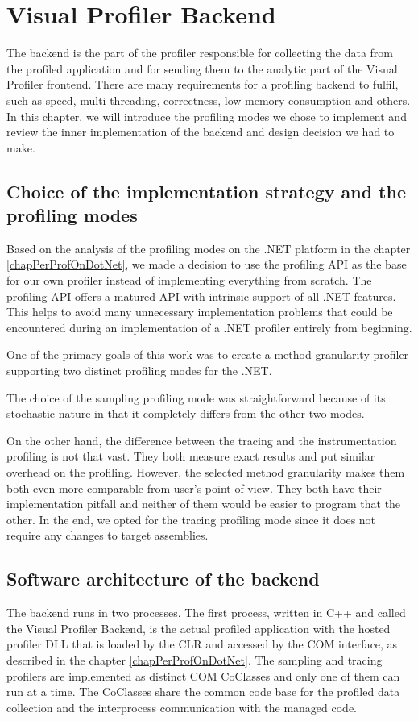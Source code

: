 \chapter{Visual Profiler Backend}
\label{chap04:chapter}
The backend is the part of the profiler responsible for collecting the data from the profiled application and for sending them to the analytic part of the Visual Profiler frontend. There are many requirements for a profiling backend to fulfil, such as speed, multi-threading, correctness, low memory consumption and others. In this chapter, we will introduce the profiling modes we chose to implement and review the inner implementation of the backend and design decision we had to make.

\section{Choice of the implementation strategy and the profiling modes}
Based on the analysis of the profiling modes on the .NET platform in the chapter \ref{chapPerProfOnDotNet}, we made a decision to use the profiling API as the base for our own profiler instead of implementing everything from scratch. The profiling API offers a 	 matured API with intrinsic support of all .NET features. This helps to avoid many unnecessary implementation problems that could be encountered during an implementation of a .NET profiler entirely from beginning.

One of the primary goals of this work was to create a method granularity profiler supporting two distinct profiling modes for the .NET.

The choice of the sampling profiling mode was straightforward because of its stochastic nature in that it completely differs from the other two modes. 

On the other hand, the difference between the tracing and the instrumentation profiling is not that vast. They both measure exact results and put similar overhead on the profiling. However, the selected method granularity makes them both even more comparable from user's point of view. They both have their implementation pitfall and neither of them would be easier to program that the other. In the end, we opted for the tracing profiling mode since it does not require any changes to target assemblies.

\section{Software architecture of the backend }
The backend runs in two processes. The first process, written in C++ and called the Visual Profiler Backend, is the actual profiled application with the hosted profiler DLL that is loaded by the CLR and accessed by the COM interface, as described in the chapter \ref{chapPerProfOnDotNet}. The sampling and tracing profilers are implemented as distinct COM CoClasses and only one of them can run at a time. The CoClasses share the common code base for the profiled data collection and the interprocess communication with the managed code.

